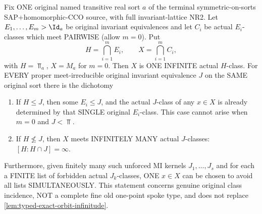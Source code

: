 \begin{lemma}
\label{lem:typed-mi-fibre-infinite-dichotomy}
Fix ONE original named transitive real sort $a$ of
the terminal symmetric-on-sorts SAP+homomorphic-CCO
source, with full invariant-lattice NR2.
Let $E_1,\ldots,E_m>\Id_a$ be original
invariant equivalences and let
$C_i$ be actual $E_i$-classes which
meet PAIRWISE (allow $m=0$).
Put
\[
       H=\bigcap_{i=1}^m E_i,\qquad
       X=\bigcap_{i=1}^m C_i,
\]
with $H=\Top_a$, $X=M_a$ for $m=0$.
Then $X$ is ONE INFINITE actual $H$-class.
For EVERY proper meet-irreducible original
invariant equivalence $J$ on the SAME
original sort there is the dichotomy
\begin{enumerate}[label=(\roman*)]
\item If $H\le J$, then some $E_i\le J$,
  and the actual $J$-class of any $x\in X$
  is already determined by that SINGLE
  original $E_i$-class. This case cannot
  arise when $m=0$ and $J<\Top$.
\item If $H\nleq J$, then $X$ meets
  INFINITELY MANY actual $J$-classes:
  $[H:H\cap J]=\infty$.
\end{enumerate}
Furthermore, given finitely many such
unforced MI kernels $J_1,\ldots,J_s$
and for each a FINITE list of forbidden
actual $J_k$-classes, ONE $x\in X$
can be chosen to avoid all lists
SIMULTANEOUSLY.
This statement concerns genuine
original class incidence, NOT a complete
fine old one-point spoke type, and does
not replace \cref{lem:typed-exact-orbit-infinitude}.
\end{lemma}
